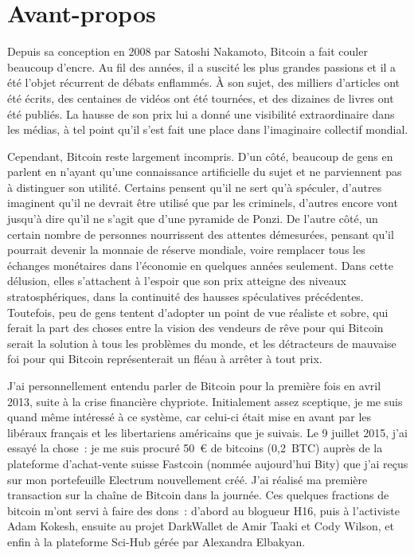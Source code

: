 
\chapter*{Avant-propos}

Depuis sa conception en 2008 par Satoshi Nakamoto, Bitcoin a fait couler beaucoup d'encre. Au fil des années, il a suscité les plus grandes passions et il a été l'objet récurrent de débats enflammés. À son sujet, des milliers d'articles ont été écrits, des centaines de vidéos ont été tournées, et des dizaines de livres ont été publiés. La hausse de son prix lui a donné une visibilité extraordinaire dans les médias, à tel point qu'il s'est fait une place dans l'imaginaire collectif mondial.

Cependant, Bitcoin reste largement incompris. D'un côté, beaucoup de gens en parlent en n'ayant qu'une connaissance artificielle du sujet et ne parviennent pas à distinguer son utilité. Certains pensent qu'il ne sert qu'à spéculer, d'autres imaginent qu'il ne devrait être utilisé que par les criminels, d'autres encore vont jusqu'à dire qu'il ne s'agit que d'une pyramide de Ponzi. De l'autre côté, un certain nombre de personnes nourrissent des attentes démesurées, pensant qu'il pourrait devenir la monnaie de réserve mondiale, voire remplacer tous les échanges monétaires dans l'économie en quelques années seulement. Dans cette délusion, elles s'attachent à l'espoir que son prix atteigne des niveaux stratosphériques, dans la continuité des hausses spéculatives précédentes. Toutefois, peu de gens tentent d'adopter un point de vue réaliste et sobre, qui ferait la part des choses entre la vision des vendeurs de rêve pour qui Bitcoin serait la solution à tous les problèmes du monde, et les détracteurs de mauvaise foi pour qui Bitcoin représenterait un fléau à arrêter à tout prix.

J'ai personnellement entendu parler de Bitcoin pour la première fois en avril 2013, suite à la crise financière chypriote. Initialement assez sceptique, je me suis quand même intéressé à ce système, car celui-ci était mise en avant par les libéraux français et les libertariens américains que je suivais. Le 9 juillet 2015, j'ai essayé la chose~: je me suis procuré 50~\euro{} de bitcoins (0,2~BTC) auprès de la plateforme d'achat-vente suisse Fastcoin (nommée aujourd'hui Bity) que j'ai reçus sur mon portefeuille Electrum nouvellement créé. J'ai réalisé ma première transaction sur la chaîne de Bitcoin dans la journée. Ces quelques fractions de bitcoin m'ont servi à faire des dons~: d'abord au blogueur H16, puis à l'activiste Adam Kokesh, ensuite au projet DarkWallet de Amir Taaki et Cody Wilson, et enfin à la plateforme Sci-Hub gérée par Alexandra Elbakyan. %

